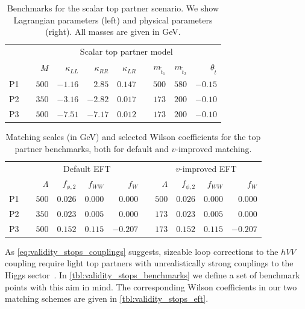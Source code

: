 \begin{table}[b]
\begin{tabular}{c c rrrr c rrr}
  \toprule
  \multirow{2}{*}{}
  && \multicolumn{8}{c}{Scalar top partner model} \\
  \cmidrule{3-10}
  && $M$ & $\kappa_{LL}$ & $\kappa_{RR}$ & $\kappa_{LR}$
  && $m_{\tilde{t}_{1}}$ & $m_{{\tilde{t}_{2}}}$ & $\theta_{\tilde{t}}$ \\
  \midrule
  P1 && $500$ & $-1.16$ & $2.85$ & $0.147$ && $500$ & $580$ & $-0.15$ \\
  P2 && $350$ & $-3.16$ & $-2.82$ & $0.017$ && $173$ & $200$ & $-0.10$ \\
  P3 && $500$ & $-7.51$ & $-7.17$ & $0.012$ && $173$ & $200$ & $-0.10$ \\
  \bottomrule
 \end{tabular}
 \caption[Benchmarks for the top partners]{Benchmarks for the
   scalar top partner scenario. We show Lagrangian parameters (left)
   and physical parameters (right). All masses are given in GeV.}
  \label{tbl:validity_stops_benchmarks}
\end{table}

\begin{table}[b]
  \begin{tabular}{c c rrrr c rrrr}
    \toprule
    \multirow{2}{*}{}
    && \multicolumn{4}{c}{Default EFT} && \multicolumn{4}{c}{$v$-improved EFT} \\
    \cmidrule{3-6} \cmidrule{8-11}
    && $\Lambda$ & $f_{\phi,2}$ & $f_{WW}$ & $f_W$
    && $\Lambda$ & $f_{\phi,2}$ & $f_{WW}$ & $f_W$ \\
    \midrule
    P1 && $500$ & $0.026$ & $0.000$ & $0.000$ && $500$ & $0.026$ & $0.000$ & $0.000$\\
    P2 && $350$ & $0.023$ & $0.005$ & $0.000$ && $173$ & $0.023$ & $0.005$ & $0.000$ \\
    P3 && $500$ & $0.152$ & $0.115$ & $-0.207$ && $173$ & $0.152$ & $0.115$ & $-0.207$ \\
    \bottomrule
  \end{tabular}
  \caption[EFT description for the top partner benchmarks]{Matching
    scales (in GeV) and selected Wilson coefficients
    for the top partner benchmarks, both for default and $v$-improved
    matching.}
  \label{tbl:validity_stops_eft}
\end{table}

As \autoref{eq:validity_stops_couplings} suggests, sizeable loop
corrections to the $hVV$ coupling require light top partners with
unrealistically strong couplings to the Higgs
sector~\cite{Hollik:2008xn}. In
\autoref{tbl:validity_stops_benchmarks} we define a set of benchmark
points with this aim in mind. The corresponding Wilson coefficients in
our two matching schemes are given in
\autoref{tbl:validity_stops_eft}.

